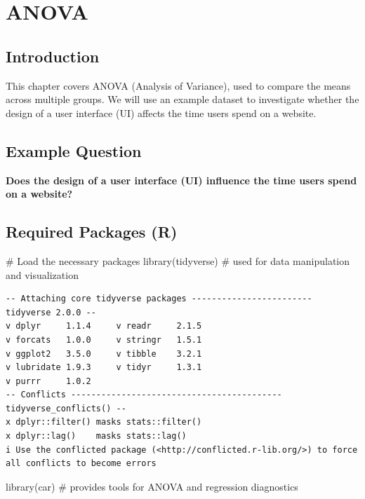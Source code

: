 \documentclass[
  letterpaper,
  DIV=11,
  numbers=noendperiod]{scrreprt}
\newenvironment{Shaded}{\begin{snugshade}}{\end{snugshade}}
\newcommand{\CommentTok}[1]{\textcolor[rgb]{0.37,0.37,0.37}{#1}}
\newcommand{\FunctionTok}[1]{\textcolor[rgb]{0.28,0.35,0.67}{#1}}
\newcommand{\NormalTok}[1]{\textcolor[rgb]{0.00,0.23,0.31}{#1}}
\begin{document}

\chapter{ANOVA}\label{anova}

\section{Introduction}\label{introduction-2}

This chapter covers ANOVA (Analysis of Variance), used to compare the
means across multiple groups. We will use an example dataset to
investigate whether the design of a user interface (UI) affects the time
users spend on a website.

\section{Example Question}\label{example-question}

\textbf{Does the design of a user interface (UI) influence the time
users spend on a website?}

\section{Required Packages (R)}\label{required-packages-r}

\begin{Shaded}
\begin{Highlighting}[]
\CommentTok{\# Load the necessary packages }
\FunctionTok{library}\NormalTok{(tidyverse) }\CommentTok{\# used for data manipulation and visualization}
\end{Highlighting}
\end{Shaded}

\begin{verbatim}
-- Attaching core tidyverse packages ------------------------ tidyverse 2.0.0 --
v dplyr     1.1.4     v readr     2.1.5
v forcats   1.0.0     v stringr   1.5.1
v ggplot2   3.5.0     v tibble    3.2.1
v lubridate 1.9.3     v tidyr     1.3.1
v purrr     1.0.2     
-- Conflicts ------------------------------------------ tidyverse_conflicts() --
x dplyr::filter() masks stats::filter()
x dplyr::lag()    masks stats::lag()
i Use the conflicted package (<http://conflicted.r-lib.org/>) to force all conflicts to become errors
\end{verbatim}

\begin{Shaded}
\begin{Highlighting}[]
\FunctionTok{library}\NormalTok{(car) }\CommentTok{\# provides tools for ANOVA and regression diagnostics}
\end{Highlighting}
\end{Shaded}
\end{document}
